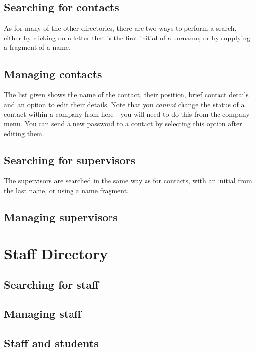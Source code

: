 \documentclass[12 pt]{book}
\begin{document}
\section{Searching for contacts}

As for many of the other directories, there are two ways to perform a search, either by clicking on
a letter that is the first initial of a surname, or by supplying a fragment of a name.

\section{Managing contacts}

The list given shows the name of the contact, their position, brief contact details and an option to
edit their details. Note that you \emph{cannot} change the status of a contact within a company
from here - you will need to do this from the company menu. You can send a new password to a contact
by selecting this option after editing them.

\section{Searching for supervisors}

The supervisors are searched in the same way as for contacts, with an initial from the last name,
or using a name fragment.

\section{Managing supervisors}
%
%
%

\chapter{Staff Directory}

\section{Searching for staff}

\section{Managing staff}

\section{Staff and students}
\end{document}
